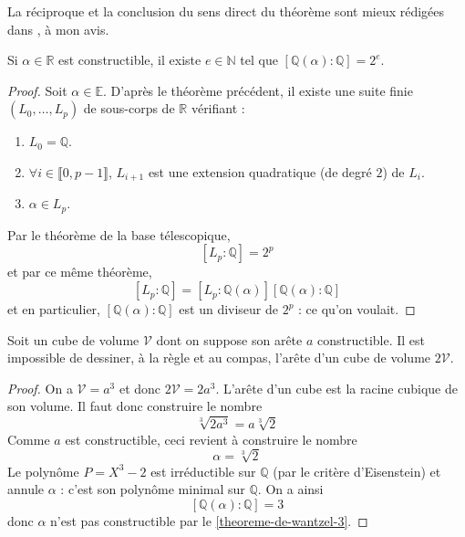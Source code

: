   La réciproque et la conclusion du sens direct du théorème sont mieux rédigées dans \cite{[GOZ]}, à mon avis.


  \begin{corollary}
    \label{theoreme-de-wantzel-3}
    Si $\alpha \in \mathbb{R}$ est constructible, il existe $e \in \mathbb{N}$ tel que $[\mathbb{Q}(\alpha):\mathbb{Q}] = 2^e$.
  \end{corollary}

  \begin{proof}
    Soit $\alpha \in \mathbb{E}$. D'après le théorème précédent, il existe une suite finie $(L_0, \dots, L_p)$ de sous-corps de $\mathbb{R}$ vérifiant :
    \begin{enumerate}[label={\bfseries(\roman*)}]
      \item $L_0 = \mathbb{Q}$.
      \item $\forall i \in \llbracket 0, p-1 \rrbracket$, $L_{i+1}$ est une extension quadratique (de degré $2$) de $L_i$.
      \item $\alpha \in L_p$.
    \end{enumerate}
    Par le théorème de la base télescopique,
    \[ [L_p : \mathbb{Q}] = 2^p \]
    et par ce même théorème,
    \[ [L_p : \mathbb{Q}] = [L_p : \mathbb{Q}(\alpha)] [\mathbb{Q}(\alpha) : \mathbb{Q}] \]
    et en particulier, $[\mathbb{Q}(\alpha) : \mathbb{Q}]$ est un diviseur de $2^p$ : ce qu'on voulait.
  \end{proof}

  \begin{application}
    Soit un cube de volume $\mathcal{V}$ dont on suppose son arête $a$ constructible. Il est impossible de dessiner, à la règle et au compas, l'arête d'un cube de volume $2\mathcal{V}$.
  \end{application}

  \begin{proof}
    On a $\mathcal{V} = a^3$ et donc $ 2\mathcal{V} = 2a^3$. L'arête d'un cube est la racine cubique de son volume. Il faut donc construire le nombre
    \[ \sqrt[3]{2a^3} = a\sqrt[3]{2} \]
    Comme $a$ est constructible, ceci revient à construire le nombre
    \[ \alpha = \sqrt[3]{2} \]
    Le polynôme $P = X^3 - 2$ est irréductible sur $\mathbb{Q}$ (par le critère d'Eisenstein) et annule $\alpha$ : c'est son polynôme minimal sur $\mathbb{Q}$. On a ainsi
    \[ [\mathbb{Q}(\alpha) : \mathbb{Q}] = 3 \]
    donc $\alpha$ n'est pas constructible par le \cref{theoreme-de-wantzel-3}.
  \end{proof}

